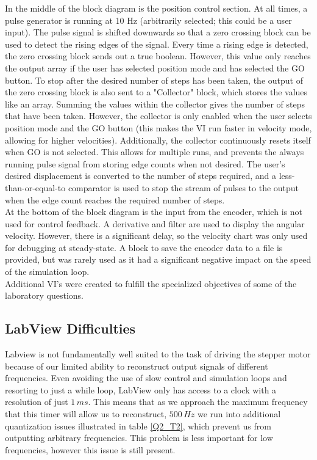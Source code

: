 \documentclass{article}
\theoremstyle{plain}
\theoremstyle{definition}
\theoremstyle{remark}
\begin{document}
In the middle of the block diagram is the position control section. At all times, a pulse generator is running at 10 Hz (arbitrarily selected; this could be a user input). The pulse signal is shifted downwards so that a zero crossing block can be used to detect the rising edges of the signal. Every time a rising edge is detected, the zero crossing block sends out a true boolean. However, this value only reaches the output array if the user has selected position mode and has selected the GO button. To stop after the desired number of steps has been taken, the output of the zero crossing block is also sent to a "Collector" block, which stores the values like an array. Summing the values within the collector gives the number of steps that have been taken. However, the collector is only enabled when the user selects position mode and the GO button (this makes the VI run faster in velocity mode, allowing for higher velocities). Additionally, the collector continuously resets itself when GO is not selected. This allows for multiple runs, and prevents the always running pulse signal from storing edge counts when not desired. The user's desired displacement is converted to the number of steps required, and a less-than-or-equal-to comparator is used to stop the stream of pulses to the output when the edge count reaches the required number of steps.\\

At the bottom of the block diagram is the input from the encoder, which is not used for control feedback. A derivative and filter are used to display the angular velocity. However, there is a significant delay, so the velocity chart was only used for debugging at steady-state. A block to save the encoder data to a file is provided, but was rarely used as it had a significant negative impact on the speed of the simulation loop.   \\

Additional VI's were created to fulfill the specialized objectives of some of the laboratory questions.\\

\subsection*{LabView Difficulties}

Labview is not fundamentally well suited to the task of driving the stepper motor because of our limited ability to reconstruct output signals of different frequencies.  Even avoiding the use of slow control and simulation loops and resorting to just a while loop, LabView only has access to a clock with a resolution of just $1 \, ms$.  This means that as we approach the maximum frequency that this timer will allow us to reconstruct, $500 \, Hz$ we run into additional quantization issues illustrated in table \ref{Q2_T2}, which prevent us from outputting arbitrary frequencies.  This problem is less important for low frequencies, however this issue is still present.  
\end{document}
